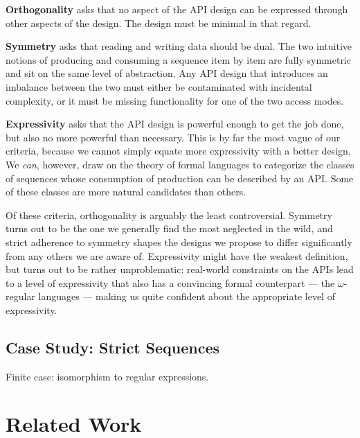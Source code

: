 \documentclass[sigplan,screen,10pt,anonymous,review]{acmart}
\begin{document}
\textbf{Orthogonality} asks that no aspect of the API design can be expressed through other aspects of the design. The design must be minimal in that regard.


\textbf{Symmetry} asks that reading and writing data should be dual. The two intuitive notions of producing and consuming a sequence item by item are fully symmetric and sit on the same level of abstraction. Any API design that introduces an imbalance between the two must either be contaminated with incidental complexity, or it must be missing functionality for one of the two access modes.

\textbf{Expressivity} asks that the API design is powerful enough to get the job done, but also no more powerful than necessary. This is by far the most vague of our criteria, because we cannot simply equate more expressivity with a better design. We \textit{can}, however, draw on the theory of formal languages to categorize the classes of sequences whose consumption of production can be described by an API. Some of these classes are more natural candidates than others.

Of these criteria, orthogonality is arguably the least controversial. Symmetry turns out to be the one we generally find the most neglected in the wild, and strict adherence to symmetry shapes the designs we propose to differ significantly from any others we are aware of. Expressivity might have the weakest definition, but turns out to be rather unproblematic: real-world constraints on the APIs lead to a level of expressivity that also has a convincing formal counterpart --- the $\omega$-regular languages --- making us quite confident about the appropriate level of expressivity.

\subsection{Case Study: Strict Sequences}

Finite case: isomorphism to regular expressions.

\section{Related Work}\label{related_work}
\end{document}
